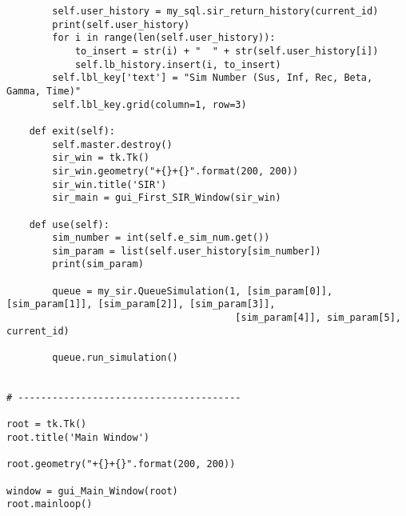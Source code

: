 \documentclass[11pt, a4paper]{article}
\begin{document}
\begin{lstlisting}
        self.user_history = my_sql.sir_return_history(current_id)
        print(self.user_history)
        for i in range(len(self.user_history)):
            to_insert = str(i) + "  " + str(self.user_history[i])
            self.lb_history.insert(i, to_insert)
        self.lbl_key['text'] = "Sim Number (Sus, Inf, Rec, Beta, Gamma, Time)"
        self.lbl_key.grid(column=1, row=3)

    def exit(self):
        self.master.destroy()
        sir_win = tk.Tk()
        sir_win.geometry("+{}+{}".format(200, 200))
        sir_win.title('SIR')
        sir_main = gui_First_SIR_Window(sir_win)

    def use(self):
        sim_number = int(self.e_sim_num.get())
        sim_param = list(self.user_history[sim_number])
        print(sim_param)

        queue = my_sir.QueueSimulation(1, [sim_param[0]], [sim_param[1]], [sim_param[2]], [sim_param[3]],
                                        [sim_param[4]], sim_param[5], current_id)

        queue.run_simulation()


# ---------------------------------------

root = tk.Tk()
root.title('Main Window')

root.geometry("+{}+{}".format(200, 200))

window = gui_Main_Window(root)
root.mainloop()
    
\end{lstlisting}
\newpage
\end{document}
